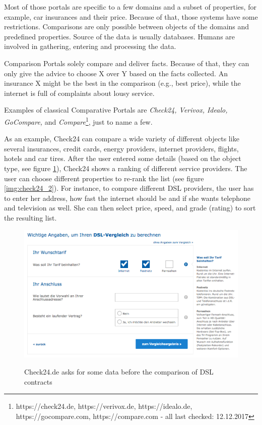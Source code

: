 Most of those portals are specific to a few domains and a subset of properties, for example, car insurances and their price. Because of that, those systems have some restrictions. Comparisons are only possible between objects of the domains and predefined properties. Source of the data is usually databases. Humans are involved in gathering, entering and processing the data.

Comparison Portals solely compare and deliver facts. Because of that, they can only give the advice to choose X over Y based on the facts collected.  An insurance X might be the best in the comparison (e.g., best price), while the internet is full of complaints about lousy service.\newline

Examples of classical Comparative Portals are \emph{Check24, Verivox, Idealo, GoCompare,} and \emph{Compare}\footnote{https://check24.de, https://verivox.de, https://idealo.de, https://gocompare.com, https://compare.com - all last checked: 12.12.2017}, just to name a few.

As an example, Check24 can compare a wide variety of different objects like several insurances, credit cards, energy providers, internet providers, flights, hotels and car tires. After the user entered some details (based on the object type, see figure \ref{img:check24_1}), Check24 shows a ranking of different service providers. The user can choose different properties to re-rank the list (see figure \ref{img:check24_2}).
For instance, to compare different DSL providers, the user has to enter her address, how fast the internet should be and if she wants telephone and television as well. She can then select price, speed, and grade (rating) to sort the resulting list.

\begin{figure}[h]
\includegraphics[width=1\textwidth]{images/ds-sys/check24_1}
\label{img:check24_1}
\caption{Check24.de asks for some data before the comparison of DSL contracts}
\end{figure}

